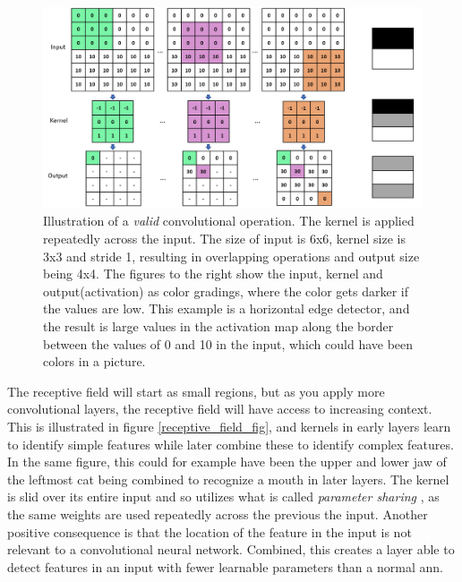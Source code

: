     \begin{figure}[H]
        \centering
        \includegraphics[scale=0.4]{figures/convolutions.png}
        \caption[Horizontal edge detector example]{Illustration of a \textit{valid} convolutional operation. The kernel is applied repeatedly across the input. The size of input is 6x6, kernel size is 3x3 and stride 1, resulting in overlapping operations and output size being 4x4. The figures to the right show the input, kernel and output(activation) as color gradings, where the color gets darker if the values are low. This example is a horizontal edge detector, and the result is large values in the activation map along the border between the values of 0 and 10 in the input, which could have been colors in a picture.}
      	\medskip 
        \label{convolutional_fig}
    \end{figure}
    
    The receptive field will start as small regions, but as you apply more convolutional layers, the receptive field will have access to increasing context\cite{o2015introduction_convolutions}. This is illustrated in figure \ref{receptive_field_fig}, and kernels in early layers learn to identify simple features while later combine these to identify complex features. In the same figure, this could for example have been the upper and lower jaw of the leftmost cat being combined to recognize a mouth in later layers. The kernel is slid over its entire input and so utilizes what is called \textit{parameter sharing }, as the same weights are used repeatedly across the previous the input. Another positive consequence is that the location of the feature in the input is not relevant to a convolutional neural network. Combined, this creates a layer able to detect features in an input with fewer learnable parameters than a normal \gls{ann}. 
    
